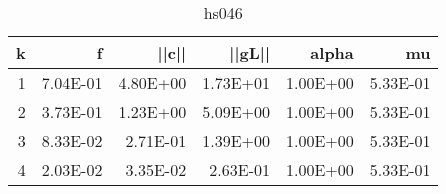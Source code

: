 \documentclass[12pt]{article}
\begin{document}
\pagebreak
\begin{table}[htbp]
  \centering
  \caption{hs046}
    \begin{tabular}{rrrrrr}
    \toprule
    k     & f     & ||c|| & ||gL||   & alpha & mu \\
    \midrule
    1     & 7.04E-01 & 4.80E+00 & 1.73E+01 & 1.00E+00 & 5.33E-01 \\
    2     & 3.73E-01 & 1.23E+00 & 5.09E+00 & 1.00E+00 & 5.33E-01 \\
    3     & 8.33E-02 & 2.71E-01 & 1.39E+00 & 1.00E+00 & 5.33E-01 \\
    4     & 2.03E-02 & 3.35E-02 & 2.63E-01 & 1.00E+00 & 5.33E-01 \\

\end{tabular}
\end{table}
\end{document}

